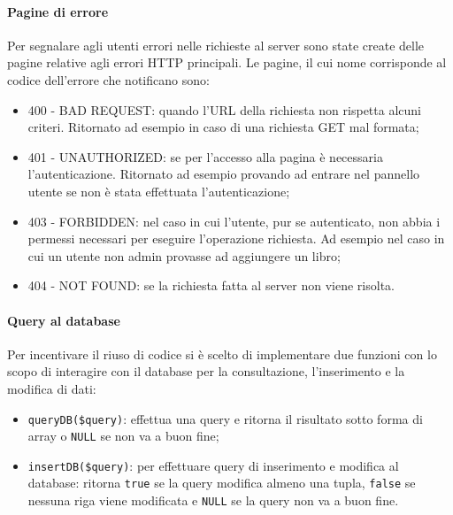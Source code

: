 \documentclass[12pt,a4paper,headings=optiontohead]{article}
\begin{document}
	\paragraph{Pagine di errore} %
	Per segnalare agli utenti errori nelle richieste al server sono state create delle pagine relative agli errori HTTP principali. Le pagine, il cui nome corrisponde al codice dell'errore che notificano sono:
	\begin{itemize}
		\item 400 - BAD REQUEST: quando l'URL della richiesta non rispetta alcuni criteri. Ritornato ad esempio in caso di una richiesta GET mal formata;
		\item 401 - UNAUTHORIZED: se per l'accesso alla pagina è necessaria l'autenticazione. Ritornato ad esempio provando ad entrare nel pannello utente se non è stata effettuata l'autenticazione;
		\item 403 - FORBIDDEN: nel caso in cui l'utente, pur se autenticato, non abbia i permessi necessari per eseguire l'operazione richiesta. Ad esempio nel caso in cui un utente non admin provasse ad aggiungere un libro;
		\item 404 - NOT FOUND: se la richiesta fatta al server non viene risolta.
	\end{itemize}
	
	\paragraph{Query al database}
	Per incentivare il riuso di codice si è scelto di implementare due funzioni con lo scopo di interagire con il database per la consultazione, l'inserimento e la modifica di dati:
	\begin{itemize}
		\item \texttt{queryDB(\$query)}: effettua una query e ritorna il risultato sotto forma di array o \texttt{NULL} se non va a buon fine;
		\item \texttt{insertDB(\$query)}: per effettuare query di inserimento e modifica al database: ritorna \texttt{true} se la query modifica almeno una tupla, \texttt{false} se nessuna riga viene modificata e \texttt{NULL} se la query non va a buon fine.
	\end{itemize}
\end{document}
